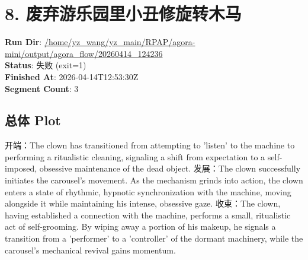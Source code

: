 \documentclass[11pt,a4paper]{article}
\begin{document}
\section{8. 废弃游乐园里小丑修旋转木马}
\textbf{Run Dir}: \url{/home/yz\_wang/yz\_main/RPAP/agora-mini/output/agora\_flow/20260414\_124236}\\
\textbf{Status}: 失败 (exit=1)\\
\textbf{Finished At}: 2026-04-14T12:53:30Z\\
\textbf{Segment Count}: 3

\subsection*{总体 Plot}
开端：The clown has transitioned from attempting to 'listen' to the machine to performing a ritualistic cleaning, signaling a shift from expectation to a self-imposed, obsessive maintenance of the dead object. 发展：The clown successfully initiates the carousel's movement. As the mechanism grinds into action, the clown enters a state of rhythmic, hypnotic synchronization with the machine, moving alongside it while maintaining his intense, obsessive gaze. 收束：The clown, having established a connection with the machine, performs a small, ritualistic act of self-grooming. By wiping away a portion of his makeup, he signals a transition from a 'performer' to a 'controller' of the dormant machinery, while the carousel's mechanical revival gains momentum.
\end{document}
